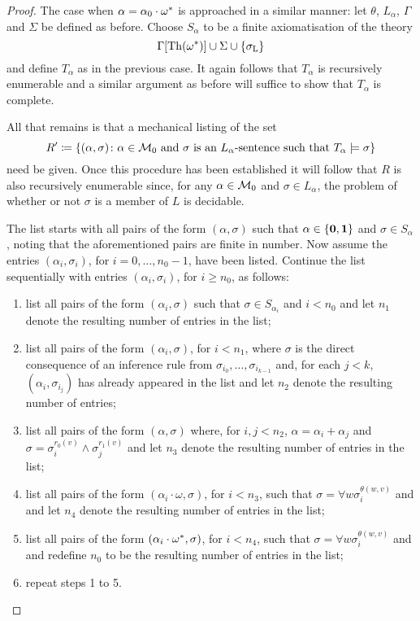 \begin{proof}
	The case when $\alpha=\alpha_0\cdot{\omega}^\ast$ is approached in a similar manner: let $\theta$, $L_\alpha$, $\Gamma$ and $\Sigma$ be defined as before.  Choose $S_\alpha$ to be a finite axiomatisation of the theory
	\begin{equation}
		\Gamma[\operatorname{Th}({\omega}^\ast)]\cup\Sigma\cup\left\lbrace \sigma_{\mathrm{L}}\right\rbrace
	\end{equation}
	and define $T_\alpha$ as in the previous case.  It again follows that $T_\alpha$ is recursively enumerable and a similar argument as before will suffice to show that $T_\alpha$ is complete.

	All that remains is that a mechanical listing of the set
	\begin{equation}
		R^\prime\coloneqq\left\lbrace (\alpha,\sigma)\colon \alpha\in\mathcal{M}_0\text{ and }\sigma\text{ is an }L_\alpha\text{-sentence such that }T_\alpha\models\sigma \right\rbrace
	\end{equation}
	need be given.  Once this procedure has been established it will follow that $R$ is also recursively enumerable since, for any $\alpha\in\mathcal{M}_0$ and $\sigma\in L_\alpha$, the problem of whether or not $\sigma$ is a member of $L$ is decidable.

	The list starts with all pairs of the form $(\alpha,\sigma)$ such that $\alpha\in\left\lbrace \mathbf{0},\mathbf{1}\right\rbrace$ and $\sigma\in S_\alpha$, noting that the aforementioned pairs are finite in number.  Now assume the entries $(\alpha_i,\sigma_i)$, for $i=0,\dotsc,n_0-1$, have been listed.  Continue the list sequentially with entries $(\alpha_i,\sigma_i)$, for $i\geq n_0$, as follows:
	\begin{enumerate}
		\item 	list all pairs of the form $(\alpha_i,\sigma)$ such that $\sigma\in S_{\alpha_i}$ and $i<n_0$ and let $n_1$ denote the resulting number of entries in the list;
		\item 	list all pairs of the form $(\alpha_i, \sigma)$, for $i<n_1$, where $\sigma$ is the direct consequence of an inference rule from $\sigma_{i_0},\dotsc,\sigma_{i_{k-1}}$ and, for each $j<k$, $(\alpha_i,\sigma_{i_j})$ has already appeared in the list and let $n_2$ denote the resulting number of entries;
		\item	list all pairs of the form $(\alpha,\sigma)$ where, for $i,j<n_2$, $\alpha=\alpha_i+\alpha_j$ and $\sigma=\sigma_i^{r_0(v)}\wedge\sigma_j^{r_1(v)}$ and let $n_3$ denote the resulting number of entries in the list;
		\item	list all pairs of the form $(\alpha_i\cdot\omega,\sigma)$, for $i<n_3$, such that $\sigma=\forall w\sigma_i^{\theta(w,v)}$ and and let $n_4$ denote the resulting number of entries in the list;
		\item	list all pairs of the form $(\alpha_i\cdot{\omega}^\ast,\sigma)$, for $i<n_4$, such that $\sigma=\forall w\sigma_i^{\theta(w,v)}$ and and redefine $n_0$ to be the resulting number of entries in the list;
		\item	repeat steps 1 to 5.
	\end{enumerate}


\end{proof}
